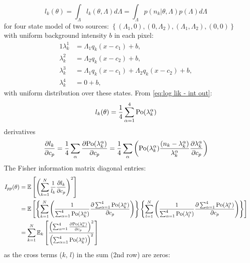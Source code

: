 \begin{equation}
	l_k(\theta)=\int_{\Lambda}l_k(\theta,\Lambda)d\Lambda=\int_{\Lambda}p(n_k|\theta,\Lambda)p(\Lambda)d\Lambda
	\label{eq:log lik - int out}
\end{equation}
%
for four state model of two sources: $\left\{ (\Lambda_1,0),(0,\Lambda_2),(\Lambda_1,\Lambda_2),(0,0)\right\}$ with uniform background intensity $b$ in each pixel: 
\begin{alignat*}{1}
	\lambda_k^1&=\Lambda_1q_k(x-c_1)+b,\\ 
	\lambda_k^2&=\Lambda_2q_k(x-c_2)+b,\\ 
	\lambda_k^3&=\Lambda_1q_k(x-c_1)+\Lambda_2q_k(x-c_2)+b,\\ 
	\lambda_k^4&=0+b,
\end{alignat*}
%
with uniform distribution over these states. From \autoref{eq:log lik - int out}:
%
\begin{equation}
	l_k(\theta)=\frac{1}{4}\sum_{\alpha=1}^4\mathrm{Po}(\lambda_k^\alpha)
\end{equation}
%
derivatives 
%
\begin{equation}
	\frac{\partial l_k}{\partial c_p}=\frac{1}{4}\sum_\alpha\frac{\partial\mathrm{Po}(\lambda_k^\alpha)}{\partial c_p}=\frac{1}{4}\sum_\alpha\left(\mathrm{Po}(\lambda_k^\alpha)\frac{(n_k-\lambda_k^\alpha)}{\lambda_k^\alpha}\frac{\partial\lambda_k^\alpha}{\partial c_p}\right)
\end{equation}
%
The Fisher information matrix diagonal entries:
%
\begin{alignat}{1}
	I_{pp}(\theta) & =\mathbb{E}\left[\left(\sum_{k=1}^N\frac{1}{l_k}\frac{\partial l_k}{\partial c_p}\right)^2\right]\nonumber \\
 	& =\mathbb{E}\left[\left\{ \sum_{k=1}^N\left(\frac{1}{\sum_{\alpha=1}^4\mathrm{Po}(\lambda_k^\alpha)}\frac{\partial\sum_{\alpha=1}^4\mathrm{Po}(\lambda_k^\alpha)}{\partial c_p}\right)\right\} \left\{ \sum_{l=1}^N\left(\frac{1}{\sum_{\alpha=1}^4\mathrm{Po}(\lambda_l^\alpha)}\frac{\partial\sum_{\alpha=1}^4\mathrm{Po}(\lambda_l^\alpha)}{\partial c_p}\right)\right\} \right]\nonumber \\
	& =\sum_{k=1}^N\mathbb{E}_k\left[\frac{\left(\sum_{\alpha=1}^4\frac{\partial\mathrm{Po}(\lambda_k^\alpha)}{\partial c_p}\right)^2}{\left(\sum_{\alpha=1}^4\mathrm{Po}(\lambda_k^\alpha)\right)^2}\right]
	\label{eq:Fisher Info Integrated Out - diagonal entries}
\end{alignat}
%
as the cross terms ($k,\, l$) in the sum (2nd row) are zeros: 
%
